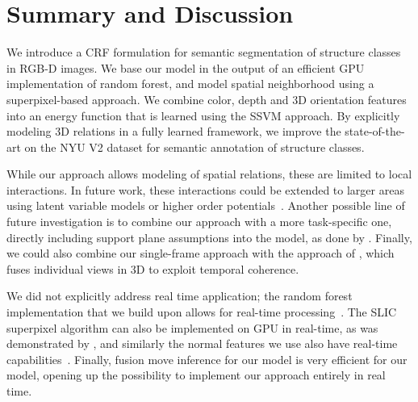 \section{Summary and Discussion}
We introduce a CRF formulation for semantic segmentation
of structure classes in \mbox{RGB-D} images. We base our model in the output of an efficient GPU implementation
of random forest, and model spatial neighborhood using a superpixel-based approach.
We combine color, depth and 3D orientation features into an energy function
that is learned using the SSVM approach. By explicitly modeling 3D relations in
a fully learned framework, we improve the state-of-the-art on the NYU V2
dataset for semantic annotation of structure classes.


While our approach allows modeling of spatial relations, these are limited to
local interactions. In future work, these interactions could be extended to
larger areas using latent variable models or higher
order potentials~\citep{ladicky2009associative}.
Another possible line of future investigation is to combine our approach with a more
task-specific one, directly including support plane assumptions into the model,
as done by \citet{SilbermanECCV12}. Finally, we could also combine our
single-frame approach with the approach of \citet{stueckler2013}, which fuses
individual views in 3D to exploit temporal coherence.

We did not explicitly address real time application; the random
forest implementation that we build upon allows for real-time
processing~\citep{stueckler2013}. The SLIC superpixel algorithm can also be
implemented on GPU in real-time, as was demonstrated by \citep{ren2011gslic}, and similarly
the normal features we use also have
real-time capabilities~\citep{holz_2011_robocup}.
Finally, fusion move inference for our model is very efficient for our model,
opening up the possibility to implement our approach entirely in real time.
